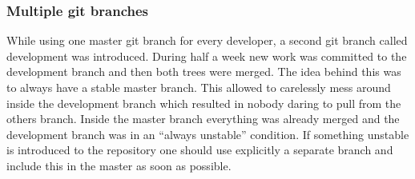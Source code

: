 \subsubsection{Multiple git branches}
While using one master git branch for every developer, a second git branch 
called development was introduced. During half a week new work was committed to the
development branch and then both trees were merged. The idea behind this was to
always have a stable master branch. This allowed to carelessly mess around
inside the development branch which resulted in nobody daring
to pull from the others branch. Inside the master branch everything was already merged and
the development branch was in an ``always unstable'' condition.
If something unstable is introduced to the repository one should use explicitly
a separate branch and include this in the master as soon as possible.

